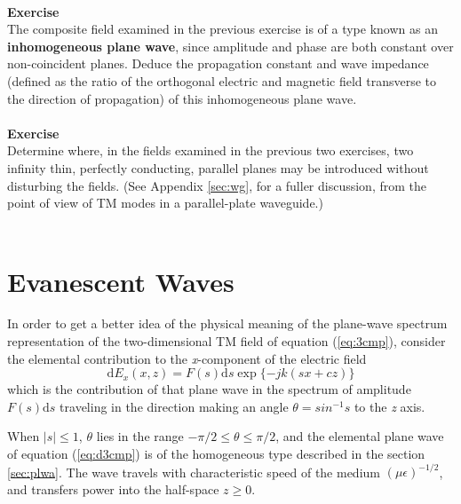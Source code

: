 \\
\noindent \textbf{Exercise}\\
\noindent The composite field examined in the previous exercise is of a type known as an \textbf{inhomogeneous plane wave}, since amplitude and phase are both constant over non-coincident planes. Deduce the propagation constant and wave impedance (defined as the ratio of the orthogonal electric and magnetic field transverse to the direction of propagation) of this inhomogeneous plane wave.\\
\\
\noindent \textbf{Exercise}\\
\noindent Determine where, in the fields examined in the previous two exercises, two infinity thin, perfectly conducting, parallel planes may be introduced without disturbing the fields. (See Appendix \ref{sec:wg}, for a fuller discussion, from the point of view of TM modes in a parallel-plate waveguide.)\\
\\
\section{Evanescent Waves}
In order to get a better idea of the physical meaning of the plane-wave spectrum representation of the two-dimensional TM field of equation (\ref{eq:3cmp}), consider the elemental contribution to the \textit{x}-component of the electric field
\begin{equation}
\mathrm{d}E_x(x,z)=F(s)\mathrm{d}s\exp\{-jk(sx+cz)\}
\label{eq:d3cmp}
\end{equation}
which is the contribution of that plane wave in the spectrum of amplitude $F(s)\mathrm{d}s$ traveling in the direction making an angle $\theta=sin^{-1}s$ to the \textit{z} axis.

When $|s|\leqslant1$, $\theta$ lies in the range $-\pi/2\leqslant\theta\leqslant\pi/2$, and the elemental plane wave of equation (\ref{eq:d3cmp}) is of the homogeneous type described in the section \ref{sec:plwa}. The wave travels with characteristic speed of the medium $(\mu\epsilon)^{-1/2}$, and transfers power into the half-space $z\geqslant0$.

